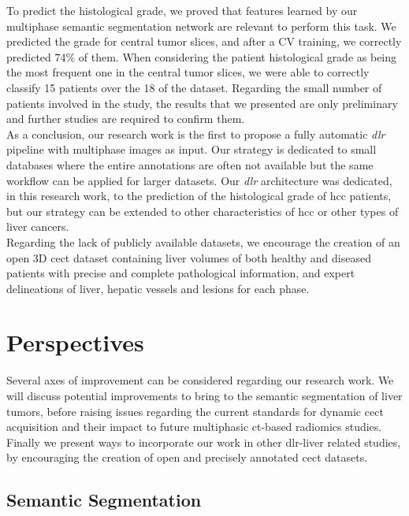 To predict the histological grade, we proved that features learned by
our multiphase semantic segmentation network are relevant to perform
this task.
We predicted the grade for central tumor slices, and after a CV
training, we correctly predicted 74\% of them. When considering the
patient histological grade as being the most frequent one in the central
tumor slices, we were able to correctly classify 15 patients over the 18
of the dataset. Regarding the small number of patients involved in the study,
the results that we presented are only preliminary and further studies are required to confirm them.\\
As a conclusion, our research work is the first to propose a fully
automatic \emph{\ac{dlr}} pipeline with multiphase images as input. Our
strategy is dedicated to small databases where the entire annotations
are often not available but the same workflow can be applied for larger
datasets. Our \emph{\ac{dlr}} architecture was dedicated, in this research
work, to the prediction of the histological grade of \ac{hcc} patients, but
our strategy can be extended to other characteristics of \ac{hcc} or other
types of liver cancers.\\
Regarding the lack of publicly available datasets, we encourage the
creation of an open 3D \ac{cect} dataset containing liver volumes of both
healthy and diseased patients with precise and complete pathological
information, and expert delineations of liver, hepatic vessels and
lesions for each phase.


\section*{Perspectives}
\label{sec:Perspectives}

Several axes of improvement can be considered regarding our research work.
We will discuss potential improvements to bring to the 
semantic segmentation of liver tumors, before raising issues regarding
the current standards for dynamic \ac{cect} acquisition and their impact to 
future multiphasic \ac{ct}-based radiomics studies.
Finally we present ways to incorporate our work in other \ac{dlr}-liver related 
studies, by encouraging the creation of open and precisely 
annotated \ac{cect} datasets.

\subsection*{Semantic Segmentation}
\label{subsec:SemanticSeg}

